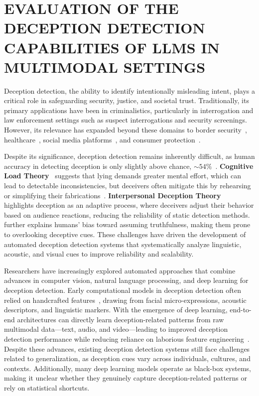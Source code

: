 \pagestyle{plain} %


\chapter{\uppercase {Evaluation of the Deception Detection Capabilities of LLMs in Multimodal Settings}}

Deception detection, the ability to identify intentionally misleading intent, plays a critical role in safeguarding security, justice, and societal trust. Traditionally, its primary applications have been in criminalistics, particularly in interrogation and law enforcement settings such as suspect interrogations and security screenings. However, its relevance has expanded beyond these domains to border security~\cite{border}, healthcare~\cite{patient-doctor}, social media platforms~\cite{dd-social}, and consumer protection~\cite{opspam}. 

Despite its significance, deception detection remains inherently difficult, as human accuracy in detecting deception is only slightly above chance, $\sim54\%$~\cite{depaulo-54}. \textbf{Cognitive Load Theory}~\cite{vrij-clt} suggests that lying demands greater mental effort, which can lead to detectable inconsistencies, but deceivers often mitigate this by rehearsing or simplifying their fabrications~\cite{vrij2}. \textbf{Interpersonal Deception Theory}~\cite{buller-idt} highlights deception as an adaptive process, where deceivers adjust their behavior based on audience reactions, reducing the reliability of static detection methods. \cite{tdt} further explains humans’ bias toward assuming truthfulness, making them prone to overlooking deceptive cues. These challenges have driven the development of automated deception detection systems that systematically analyze linguistic, acoustic, and visual cues to improve reliability and scalability.

Researchers have increasingly explored automated approaches that combine advances in computer vision, natural language processing, and deep learning for deception detection. Early computational models in deception detection often relied on handcrafted features~\cite{Ekman2001, Zhang2020MultimodalDD, 8684170, Fan, Bai2019AutomaticLD}, drawing from facial micro-expressions, acoustic descriptors, and linguistic markers. With the emergence of deep learning, end-to-end architectures can directly learn deception-related patterns from raw multimodal data—text, audio, and video—leading to improved deception detection performance while reducing reliance on laborious feature engineering~\cite{dolos, SEPSIS, guo2024}. Despite these advances, existing deception detection systems still face challenges related to generalization, as deception cues vary across individuals, cultures, and contexts. Additionally, many deep learning models operate as black-box systems, making it unclear whether they genuinely capture deception-related patterns or rely on statistical shortcuts.

